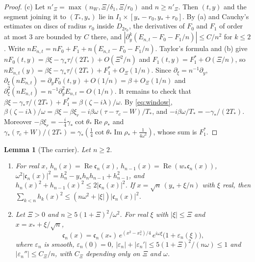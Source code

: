 \documentclass[11pt]{amsart}
\newtheorem{lemma}[theorem]{Lemma}
\theoremstyle{definition}
\theoremstyle{remark}
\numberwithin{equation}{section}
\newcommand{\eps}{\varepsilon}
\DeclareMathOperator{\re}{Re}
\DeclareMathOperator{\im}{Im}
\begin{document}
\begin{proof}
(c) Let $n'_\Xi=\max(n_W,\Xi/\delta_1,\Xi/r_0)$ and $n\ge n'_\Xi$. Then $(t,y)$ and the segment joining it to $(T_*,y_*)$ lie in
$I_1\times[y_*-r_0,y_*+r_0]$. By (a) and Cauchy's estimates on discs of radius $r_0$ inside $D_{2r_0}$, the derivatives
of $F_0$ and $F_1$ of order at most $3$ are bounded by $C$ there, and $|\partial_y^k(E_{n,t}-F_0-F_1/n)|\le C/n^2$ for
$k\le2$. Write $nE_{n,t}=nF_0+F_1+n(E_{n,t}-F_0-F_1/n)$. Taylor's formula and (b) give
$nF_0(t,y)=\beta\xi-\gamma_*\tau/(2T_*)+O(\Xi^2/n)$ and $F_1(t,y)=F_1^*+O(\Xi/n)$, so
$nE_{n,t}(y)=\beta\xi-\gamma_*\tau/(2T_*)+F_1^*+O_\Xi(1/n)$. Since $\partial_\xi=n^{-1}\partial_y$,
$\partial_\xi(nE_{n,t})=\partial_yF_0(t,y)+O(1/n)=\beta+O_\Xi(1/n)$ and $\partial_\xi^2(nE_{n,t})=n^{-1}\partial_y^2E_{n,t}=O(1/n)$.
It remains to check that $\beta\xi-\gamma_*\tau/(2T_*)+F_1^*=\beta(\zeta-i\lambda)/\omega$. By \eqref{eq:window},
$\beta(\zeta-i\lambda)/\omega=\beta\xi-\beta\xi_r-i\beta\omega(\tau-\tau_c-W)/T_*$, and $-i\beta\omega/T_*=-\gamma_*/(2T_*)$.
Moreover $-\beta\xi_r=-\frac i4\gamma_*\cot\theta_*\re\rho_*$ and
$\gamma_*(\tau_c+W)/(2T_*)=\gamma_*(\frac14\cot\theta_*\im\rho_*+\frac1{4\omega^2})$, whose sum is $F_1^*$.
\end{proof}

\begin{lemma}[The carrier]\label{lem:carrier}
Let $n\ge2$.
\begin{enumerate}
\item[(a)] For real $x$, $h_n(x)=\re\mathfrak c_n(x)$, $h_{n-1}(x)=\re(w_*\mathfrak c_n(x))$,
$\omega^2|\mathfrak c_n(x)|^2=h_n^2-y_*h_nh_{n-1}+h_{n-1}^2$, and $h_n(x)^2+h_{n-1}(x)^2\le2|\mathfrak c_n(x)|^2$. If
$x=\sqrt n\,(y_*+\xi/n)$ with $\xi$ real, then $\sum_{k<n}h_k(x)^2\le(n\omega^2+|\xi|)|\mathfrak c_n(x)|^2$.
\item[(b)] Let $\Xi>0$ and $n\ge5(1+\Xi)^2/\omega^2$. For real $\xi$ with $|\xi|\le \Xi$ and $x=x_*+\xi/\sqrt n$,
\[
\mathfrak c_n(x)=\mathfrak c_n(x_*)\,e^{(x^2-x_*^2)/4}\,e^{i\omega\xi}\bigl(1+\eps_n(\xi)\bigr),
\]
where $\eps_n$ is smooth, $\eps_n(0)=0$, $|\eps_n|+|\eps_n'|\le5(1+\Xi)^2/(n\omega)\le1$ and $|\eps_n''|\le C_\Xi/n$, with
$C_\Xi$ depending only on $\Xi$ and $\omega$.
\end{enumerate}
\end{lemma}
\end{document}
